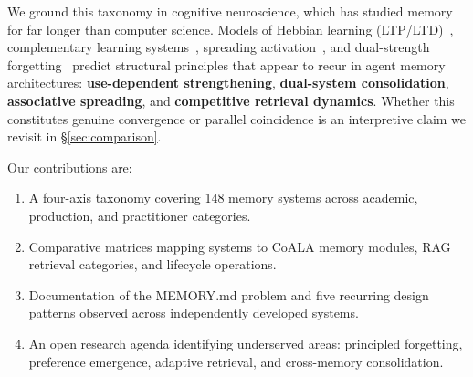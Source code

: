 We ground this taxonomy in cognitive neuroscience, which has studied
memory for far longer than computer science. Models of Hebbian learning
(LTP/LTD)~\cite{hebb1949, bliss1973}, complementary learning
systems~\cite{mcclelland1995}, spreading activation~\cite{collins1975},
and dual-strength forgetting~\cite{bjork1992} predict structural
principles that appear to recur in agent memory architectures:
\textbf{use-dependent strengthening}, \textbf{dual-system
consolidation}, \textbf{associative spreading}, and \textbf{competitive
retrieval dynamics}. Whether this constitutes genuine convergence or
parallel coincidence is an interpretive claim we revisit in
\S\ref{sec:comparison}.

Our contributions are:
\begin{enumerate}[leftmargin=*, nosep]
    \item A four-axis taxonomy covering 148 memory systems across
    academic, production, and practitioner categories.
    \item Comparative matrices mapping systems to CoALA memory
    modules, RAG retrieval categories, and lifecycle operations.
    \item Documentation of the MEMORY.md problem and five recurring
    design patterns observed across independently developed systems.
    \item An open research agenda identifying underserved areas:
    principled forgetting, preference emergence, adaptive retrieval,
    and cross-memory consolidation.
\end{enumerate}

